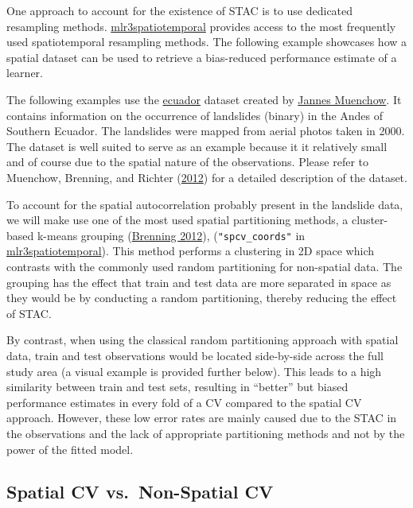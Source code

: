 \documentclass[
]{scrbook}
\begin{document}
One approach to account for the existence of STAC is to use dedicated resampling methods.
\href{https://github.com/mlr-org/mlr3spatiotemporal}{mlr3spatiotemporal} provides access to the most frequently used spatiotemporal resampling methods.
The following example showcases how a spatial dataset can be used to retrieve a bias-reduced performance estimate of a learner.

The following examples use the \href{https://mlr3spatiotempcv.mlr-org.com/reference/mlr_tasks_ecuador.html}{ecuador} dataset created by \href{https://scholar.google.com/citations?user=Slq94Y4AAAAJ\&hl=de\&authuser=1\&oi=ao}{Jannes Muenchow}.
It contains information on the occurrence of landslides (binary) in the Andes of Southern Ecuador.
The landslides were mapped from aerial photos taken in 2000.
The dataset is well suited to serve as an example because it it relatively small and of course due to the spatial nature of the observations.
Please refer to Muenchow, Brenning, and Richter (\protect\hyperlink{ref-muenchow2012}{2012}) for a detailed description of the dataset.

To account for the spatial autocorrelation probably present in the landslide data, we will make use one of the most used spatial partitioning methods, a cluster-based k-means grouping (\protect\hyperlink{ref-brenning2012}{Brenning 2012}), (\texttt{"spcv\_coords"} in \href{https://github.com/mlr-org/mlr3spatiotemporal}{mlr3spatiotemporal}).
This method performs a clustering in 2D space which contrasts with the commonly used random partitioning for non-spatial data.
The grouping has the effect that train and test data are more separated in space as they would be by conducting a random partitioning, thereby reducing the effect of STAC.

By contrast, when using the classical random partitioning approach with spatial data, train and test observations would be located side-by-side across the full study area (a visual example is provided further below).
This leads to a high similarity between train and test sets, resulting in ``better'' but biased performance estimates in every fold of a CV compared to the spatial CV approach.
However, these low error rates are mainly caused due to the STAC in the observations and the lack of appropriate partitioning methods and not by the power of the fitted model.

\hypertarget{sp-vs-nsp-cv}{%
\subsection{Spatial CV vs.~Non-Spatial CV}\label{sp-vs-nsp-cv}}
\end{document}
